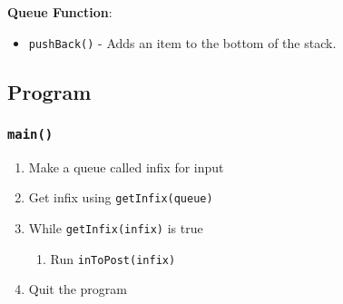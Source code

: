 \documentclass{article}
\begin{document}
        \textbf{Queue Function}:
        \begin{itemize}
            \item \texttt{pushBack()} - Adds an item to the bottom of the stack.
        \end{itemize}
    
    \subsection{Program}
        \subsubsection{\texttt{main()}}
        \begin{enumerate}
            \item Make a queue called infix for input
            \item Get infix using \texttt{getInfix(queue)}
            \item While \texttt{getInfix(infix)} is true
                \begin{enumerate}
                    \item Run \texttt{inToPost(infix)}
                \end{enumerate}
            \item Quit the program
        \end{enumerate}
\end{document}
